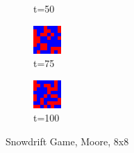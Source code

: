 \documentclass[a4paper, 11pt]{article}
\begin{document}
\begin{figure}[H]
\begin{subfigure}{.25\textwidth}
  \caption{t=50}
\end{subfigure}%
\begin{subfigure}{.25\textwidth}
  \centering
  \includegraphics[width=0.9\linewidth]{SNOWDRIFT_MOORE_8x8_t75}
  \caption{t=75}
\end{subfigure}%
\begin{subfigure}{.25\textwidth}
  \centering
  \includegraphics[width=0.9\linewidth]{SNOWDRIFT_MOORE_8x8_t100}
  \caption{t=100}
\end{subfigure}
\caption{Snowdrift Game, Moore, 8x8}
\end{figure}
\end{document}
